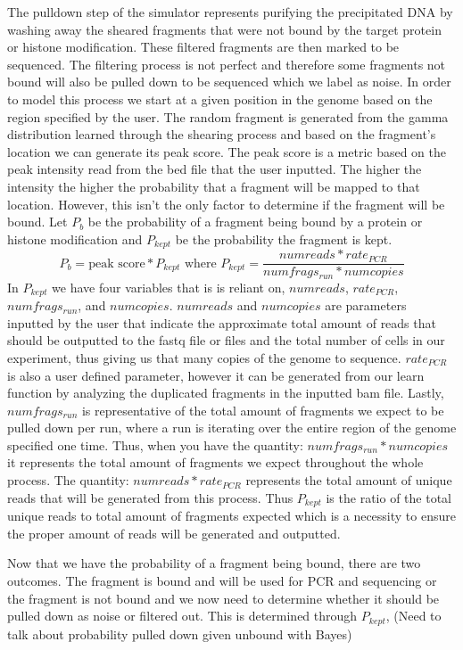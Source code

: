 \documentclass[12pt]{article}
\begin{document}
The pulldown step of the simulator represents purifying the precipitated DNA by washing away the sheared fragments that were not bound by the target protein or histone modification. These filtered fragments are then marked to be sequenced. The filtering process is not perfect and therefore some fragments not bound will also be pulled down to be sequenced which we label as noise. In order to model this process we start at a given position in the genome based on the region specified by the user. The random fragment is generated from the gamma distribution learned through the shearing process and based on the fragment's location we can generate its peak score. The peak score is a metric based on the peak intensity read from the bed file that the user inputted. The higher the intensity the higher the probability that a fragment will be mapped to that location. However, this isn't the only factor to determine if the fragment will be bound. Let $P_b$ be the probability of a fragment being bound by a protein or histone modification and $P_{kept}$ be the probability the fragment is kept. 
$$P_b = \text{peak score} * P_{kept} \text{ where } P_{kept} = \dfrac{numreads * rate_{PCR}}{numfrags_{run} * numcopies}$$
In $P_{kept}$ we have four variables that is is reliant on, $numreads$, $rate_{PCR}$, $numfrags_{run}$, and $numcopies$. $numreads$ and $numcopies$ are parameters inputted by the user that indicate the approximate total amount of reads that should be outputted to the fastq file or files and the total number of cells in our experiment, thus giving us that many copies of the genome to sequence. $rate_{PCR}$ is also a user defined parameter, however it can be generated from our learn function by analyzing the duplicated fragments in the inputted bam file. Lastly, $numfrags_{run}$ is representative of the total amount of fragments we expect to be pulled down per run, where a run is iterating over the entire region of the genome specified one time. Thus, when you have the quantity: $numfrags_{run}*numcopies$ it represents the total amount of fragments we expect throughout the whole process. The quantity: $numreads*rate_{PCR}$ represents the total amount of unique reads that will be generated from this process. Thus $P_{kept}$ is the ratio of the total unique reads to total amount of fragments expected which is a necessity to ensure the proper amount of reads will be generated and outputted. 

Now that we have the probability of a fragment being bound, there are two outcomes. The fragment is bound and will be used for PCR and sequencing or the fragment is not bound and we now need to determine whether it should be pulled down as noise or filtered out. This is determined through $P_{kept}$, 
(Need to talk about probability pulled down given unbound with Bayes)
\end{document}
